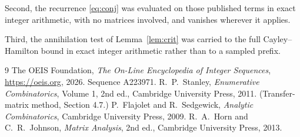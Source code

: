 \documentclass[11pt,a4paper]{article}
\theoremstyle{plain}
\theoremstyle{definition}
\begin{document}
Second, the recurrence \eqref{eq:conj} was evaluated on those published terms in exact
integer arithmetic, with no matrices involved, and vanishes wherever it applies.

Third, the annihilation test of Lemma~\ref{lem:crit} was carried to the full
Cayley--Hamilton bound in exact integer arithmetic rather than to a sampled prefix.

\begin{thebibliography}{9}
 The OEIS Foundation, \emph{The On-Line Encyclopedia of Integer
Sequences}, \url{https://oeis.org}, 2026. Sequence A223971.
 R.~P.~Stanley, \emph{Enumerative Combinatorics}, Volume 1, 2nd ed.,
Cambridge University Press, 2011. (Transfer-matrix method, Section 4.7.)
 P.~Flajolet and R.~Sedgewick, \emph{Analytic Combinatorics}, Cambridge
University Press, 2009.
 R.~A.~Horn and C.~R.~Johnson, \emph{Matrix Analysis}, 2nd ed., Cambridge
University Press, 2013.
\end{thebibliography}
\end{document}

